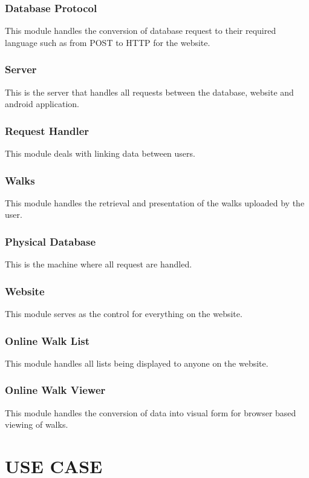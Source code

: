 \documentclass[12pt]{article}
\begin{document}
\subsubsection{Database Protocol}
This module handles the conversion of database request to their required language such as from POST to HTTP for the website.
\subsubsection{Server}
This is the server that handles all requests between the database, website and android application.
\subsubsection{Request Handler}
\par{This module deals with linking data between users.}
\subsubsection{Walks}
This module handles the retrieval and presentation of the walks uploaded by the user.
\subsubsection{Physical Database}
\par{This is the machine where all request are handled.}
\subsubsection{Website}
\par{This module serves as the control for everything on the website.}
\subsubsection{Online Walk List}
This module handles all lists being displayed to anyone on the website.
\subsubsection{Online Walk Viewer}
This module handles the conversion of data into visual form for browser based viewing of walks.
\newpage
\section{USE CASE}
\end{document}
